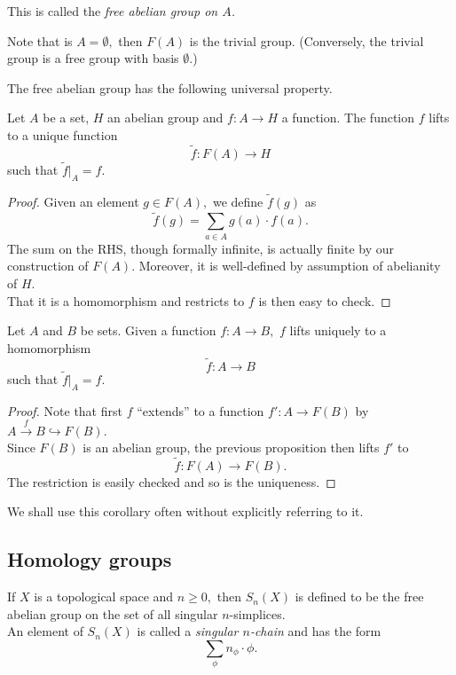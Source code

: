 \documentclass[12pt]{article}
\begin{document}
This is called the \emph{free abelian group on $A$.}

Note that is $A = \emptyset,$ then $F(A)$ is the trivial group. (Conversely, the trivial group is a free group with basis $\emptyset.$)

The free abelian group has the following universal property.

\begin{thm}
	Let $A$ be a set, $H$ an abelian group and $f:A \to H$ a function. The function $f$ lifts to a unique function
	\begin{equation*} 
		\tilde{f}:F(A) \to H
	\end{equation*}
	such that $\tilde{f}|_A = f.$
\end{thm}
\begin{proof} 
	Given an element $g\in F(A),$ we define $\tilde{f}(g)$ as
	\begin{equation*} 
		\tilde{f}(g) = \sum_{a\in A}^{}g(a)\cdot f(a).
	\end{equation*}
	The sum on the RHS, though formally infinite, is actually finite by our construction of $F(A).$ Moreover, it is well-defined by assumption of abelianity of $H.$ \\
	That it is a homomorphism and restricts to $f$ is then easy to check.
\end{proof}

\begin{cor}
	Let $A$ and $B$ be sets. Given a function $f:A\to B,$ $f$ lifts uniquely to a homomorphism
	\begin{equation*} 
		\tilde{f}:A\to B
	\end{equation*}
	such that $\tilde{f}|_A = f.$
\end{cor}
\begin{proof} 
	Note that first $f$ ``extends'' to a function $f':A\to F(B)$ by $A\overset{f}{\longrightarrow}B \hookrightarrow F(B).$\\
	Since $F(B)$ is an abelian group, the previous proposition then lifts $f'$ to 
	\begin{equation*} 
		\tilde{f}:F(A) \to F(B).
	\end{equation*}
	The restriction is easily checked and so is the uniqueness.
\end{proof}

We shall use this corollary often without explicitly referring to it.

\subsection{Homology groups}
\begin{defn}
	If $X$ is a topological space and $n \ge 0,$ then $S_n(X)$ is defined to be the free abelian group on the set of all singular $n$-simplices.\\
	An element of $S_n(X)$ is called a \emph{singular $n$-chain} and has the form
	\begin{equation*} 
		\sum_{\phi}n_{\phi}\cdot\phi.
	\end{equation*}
\end{defn}
\end{document}
